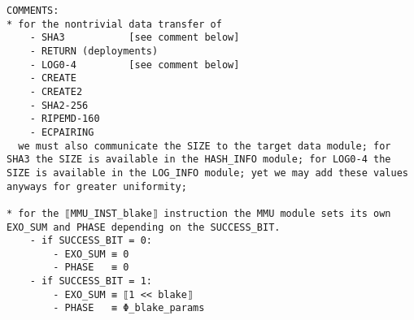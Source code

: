 \documentclass[varwidth=\maxdimen,margin=0.5cm,multi={verbatim}]{standalone}
\begin{document}
\begin{verbatim}
COMMENTS:
* for the nontrivial data transfer of
    - SHA3           [see comment below]
    - RETURN (deployments)
    - LOG0-4         [see comment below]
    - CREATE
    - CREATE2
    - SHA2-256
    - RIPEMD-160
    - ECPAIRING
  we must also communicate the SIZE to the target data module; for SHA3 the SIZE is available in the HASH_INFO module; for LOG0-4 the SIZE is available in the LOG_INFO module; yet we may add these values anyways for greater uniformity;

* for the ⟦MMU_INST_blake⟧ instruction the MMU module sets its own EXO_SUM and PHASE depending on the SUCCESS_BIT.
    - if SUCCESS_BIT = 0:
        - EXO_SUM ≡ 0
        - PHASE   ≡ 0
    - if SUCCESS_BIT = 1:
        - EXO_SUM ≡ ⟦1 << blake⟧
        - PHASE   ≡ Φ_blake_params

\end{verbatim}
\end{document}
